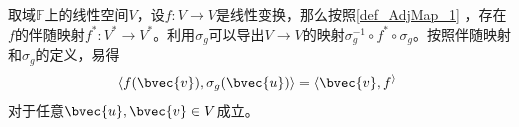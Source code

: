 取域$\mathbb{F}$上的线性空间$V$，设$f:V\to V$是线性变换，那么按照\autoref{def_AdjMap_1} ，存在$f$的伴随映射$f^*:V^*\to V^*$。利用$\sigma_g$可以导出$V\to V$的映射$\sigma_g^{-1}\circ f^*\circ \sigma_g$。按照伴随映射和$\sigma_g$的定义，易得
\begin{equation}
\begin{aligned}
\langle f(\bvec{v}), \sigma_g(\bvec{u}) \rangle = \langle \bvec{v} , f^ \rangle
\end{aligned}~
\end{equation}
对于任意$\bvec{u}, \bvec{v}\in V$成立。























